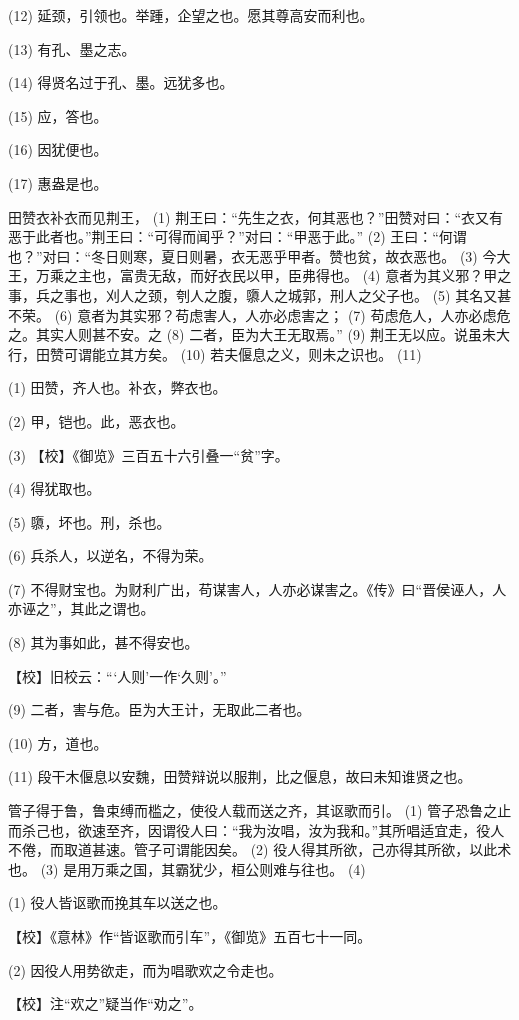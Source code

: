 \documentclass[12pt,UTF8]{ctexbook}
\begin{document}
(12) 延颈，引领也。举踵，企望之也。愿其尊高安而利也。

(13) 有孔、墨之志。

(14) 得贤名过于孔、墨。远犹多也。

(15) 应，答也。

(16) 因犹便也。

(17) 惠盎是也。

田赞衣补衣而见荆王， (1) 荆王曰：“先生之衣，何其恶也？”田赞对曰：“衣又有恶于此者也。”荆王曰：“可得而闻乎？”对曰：“甲恶于此。” (2) 王曰：“何谓也？”对曰：“冬日则寒，夏日则暑，衣无恶乎甲者。赞也贫，故衣恶也。 (3) 今大王，万乘之主也，富贵无敌，而好衣民以甲，臣弗得也。 (4) 意者为其义邪？甲之事，兵之事也，刈人之颈，刳人之腹，隳人之城郭，刑人之父子也。 (5) 其名又甚不荣。 (6) 意者为其实邪？苟虑害人，人亦必虑害之； (7) 苟虑危人，人亦必虑危之。其实人则甚不安。之 (8) 二者，臣为大王无取焉。” (9) 荆王无以应。说虽未大行，田赞可谓能立其方矣。 (10) 若夫偃息之义，则未之识也。 (11)

(1) 田赞，齐人也。补衣，弊衣也。

(2) 甲，铠也。此，恶衣也。

(3) 【校】《御览》三百五十六引叠一“贫”字。

(4) 得犹取也。

(5) 隳，坏也。刑，杀也。

(6) 兵杀人，以逆名，不得为荣。

(7) 不得财宝也。为财利广出，苟谋害人，人亦必谋害之。《传》曰“晋侯诬人，人亦诬之”，其此之谓也。

(8) 其为事如此，甚不得安也。

【校】旧校云：“‘人则’一作‘久则’。”

(9) 二者，害与危。臣为大王计，无取此二者也。

(10) 方，道也。

(11) 段干木偃息以安魏，田赞辩说以服荆，比之偃息，故曰未知谁贤之也。

管子得于鲁，鲁束缚而槛之，使役人载而送之齐，其讴歌而引。 (1) 管子恐鲁之止而杀己也，欲速至齐，因谓役人曰：“我为汝唱，汝为我和。”其所唱适宜走，役人不倦，而取道甚速。管子可谓能因矣。 (2) 役人得其所欲，己亦得其所欲，以此术也。 (3) 是用万乘之国，其霸犹少，桓公则难与往也。 (4)

(1) 役人皆讴歌而挽其车以送之也。

【校】《意林》作“皆讴歌而引车”，《御览》五百七十一同。

(2) 因役人用势欲走，而为唱歌欢之令走也。

【校】注“欢之”疑当作“劝之”。
\end{document}
